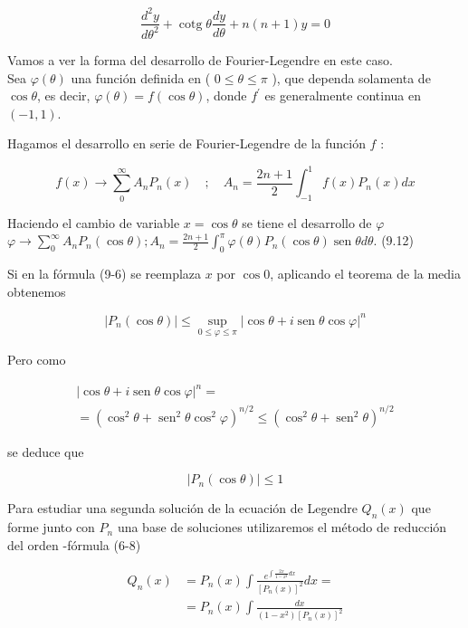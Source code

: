 \documentclass[10pt]{article}
\theoremstyle{plain}
\theoremstyle{definition}
\theoremstyle{remark}
\begin{document}
\begin{equation*}
\frac{d^{2} y}{d \theta^{2}}+\operatorname{cotg} \theta \frac{d y}{d \theta}+n(n+1) y=0 \tag{9-11}
\end{equation*}


Vamos a ver la forma del desarrollo de Fourier-Legendre en este caso.\\
Sea $\varphi(\theta)$ una función definida en ( $0 \leqslant \theta \leqslant \pi$ ), que dependa solamenta de $\cos \theta$, es decir, $\varphi(\theta)=f(\cos \theta)$, donde $f^{\prime}$ es generalmente continua en $(-1,1)$.

Hagamos el desarrollo en serie de Fourier-Legendre de la función $f$ :

$$
f(x) \rightarrow \sum_{0}^{\infty} A_{n} P_{n}(x) \quad ; \quad A_{n}=\frac{2 n+1}{2} \int_{-1}^{1} f(x) P_{n}(x) d x
$$

Haciendo el cambio de variable $x=\cos \theta$ se tiene el desarrollo de $\varphi$\\
$\varphi \rightarrow \sum_{0}^{\infty} A_{n} P_{n}(\cos \theta) ; A_{n}=\frac{2 n+1}{2} \int_{0}^{\pi} \varphi(\theta) P_{n}(\cos \theta) \operatorname{sen} \theta d \theta$. (9.12)

Si en la fórmula (9-6) se reemplaza $x$ por $\cos 0$, aplicando el teorema de la media obtenemos

$$
\left|P_{n}(\cos \theta)\right| \leqslant \sup _{0 \leqslant \varphi \leqslant \pi}|\cos \theta+i \operatorname{sen} \theta \cos \varphi|^{n}
$$

Pero como

$$
\begin{gathered}
|\cos \theta+i \operatorname{sen} \theta \cos \varphi|^{n}= \\
=\left(\cos ^{2} \theta+\operatorname{sen}^{2} \theta \cos ^{2} \varphi\right)^{n / 2} \leqslant\left(\cos ^{2} \theta+\operatorname{sen}^{2} \theta\right)^{n / 2}
\end{gathered}
$$

se deduce que

$$
\left|P_{n}(\cos \theta)\right| \leqslant 1
$$

Para estudiar una segunda solución de la ecuación de Legendre $Q_{n}(x)$ que forme junto con $P_{n}$ una base de soluciones utilizaremos el método de reducción del orden -fórmula (6-8)


\begin{align*}
Q_{n}(x) & =P_{n}(x) \int \frac{e^{\int \frac{2 x}{1-x^{2}} d x}}{\left[P_{n}(x)\right]^{2}} d x= \\
& =P_{n}(x) \int \frac{d x}{\left(1-x^{2}\right)\left[P_{n}(x)\right]^{2}} \tag{9-13}
\end{align*}
\end{document}
